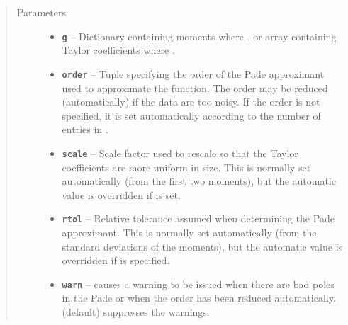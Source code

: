 \documentclass[letterpaper,10pt,english]{sphinxmanual}
\begin{document}
\begin{fulllineitems}
\begin{itemize}
\begin{description}
\end{description}

\end{itemize}
\begin{quote}\begin{description}
\item[{Parameters}] \leavevmode\begin{itemize}
\item {} 
\textbf{\texttt{g}} -- Dictionary containing moments where ,
or array containing Taylor coefficients where
.

\item {} 
\textbf{\texttt{order}} -- Tuple  specifying the order of the Pade
approximant used to approximate the function. The order may
be reduced (automatically) if the data are too noisy.
If the order is not specified, it is set automatically
according to the number of entries in .

\item {} 
\textbf{\texttt{scale}} -- Scale factor used to rescale  so that
the Taylor coefficients are more uniform in size. This is
normally set automatically (from the first two moments),
but the automatic value is overridden if  is set.

\item {} 
\textbf{\texttt{rtol}} -- Relative tolerance assumed when determining the
Pade approximant. This is normally set automatically
(from the standard deviations of the moments), but the
automatic value is overridden if  is specified.

\item {} 
\textbf{\texttt{warn}} --  causes a warning to be issued when there are
bad poles in the Pade or when the order has been reduced
automatically.  (default) suppresses the warnings.

\end{itemize}

\end{description}\end{quote}

\end{fulllineitems}

\end{document}
